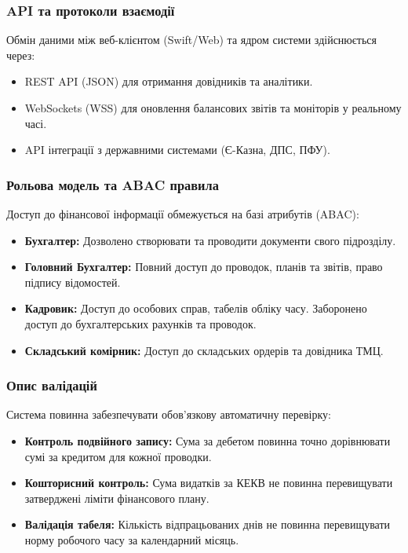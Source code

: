 \documentclass{article}
\begin{document}
\subsubsection{API та протоколи взаємодії}
Обмін даними між веб-клієнтом (Swift/Web) та ядром системи здійснюється через:
\begin{itemize}
    \item REST API (JSON) для отримання довідників та аналітики.
    \item WebSockets (WSS) для оновлення балансових звітів та моніторів у реальному часі.
    \item API інтеграції з державними системами (Є-Казна, ДПС, ПФУ).
\end{itemize}

\subsubsection{Рольова модель та ABAC правила}
Доступ до фінансової інформації обмежується на базі атрибутів (ABAC):
\begin{itemize}
    \item \textbf{Бухгалтер:} Дозволено створювати та проводити документи свого підрозділу.
    \item \textbf{Головний Бухгалтер:} Повний доступ до проводок, планів та звітів, право підпису відомостей.
    \item \textbf{Кадровик:} Доступ до особових справ, табелів обліку часу. Заборонено доступ до бухгалтерських рахунків та проводок.
    \item \textbf{Складський комірник:} Доступ до складських ордерів та довідника ТМЦ.
\end{itemize}

\subsubsection{Опис валідацій}
Система повинна забезпечувати обов'язкову автоматичну перевірку:
\begin{itemize}
    \item \textbf{Контроль подвійного запису:} Сума за дебетом повинна точно дорівнювати сумі за кредитом для кожної проводки.
    \item \textbf{Кошторисний контроль:} Сума видатків за КЕКВ не повинна перевищувати затверджені ліміти фінансового плану.
    \item \textbf{Валідація табеля:} Кількість відпрацьованих днів не повинна перевищувати норму робочого часу за календарний місяць.
\end{itemize}
\end{document}
